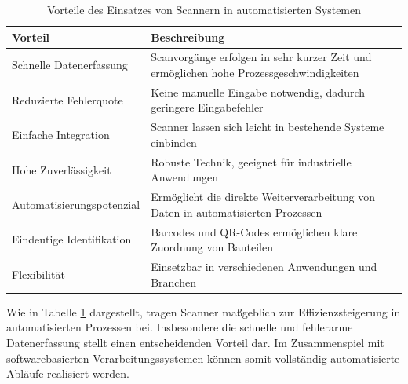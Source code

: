 \begin{table}[H]
	\centering
	\renewcommand{\arraystretch}{1.3}
	\begin{tabular}{|p{5cm}|p{7cm}|}
		\hline
		\textbf{Vorteil} & \textbf{Beschreibung} \\ \hline
		Schnelle Datenerfassung & Scanvorgänge erfolgen in sehr kurzer Zeit und ermöglichen hohe Prozessgeschwindigkeiten \\ \hline
		Reduzierte Fehlerquote & Keine manuelle Eingabe notwendig, dadurch geringere Eingabefehler \\ \hline
		Einfache Integration & Scanner lassen sich leicht in bestehende Systeme einbinden \\ \hline
		Hohe Zuverlässigkeit & Robuste Technik, geeignet für industrielle Anwendungen \\ \hline
		Automatisierungspotenzial & Ermöglicht die direkte Weiterverarbeitung von Daten in automatisierten Prozessen \\ \hline
		Eindeutige Identifikation & Barcodes und QR-Codes ermöglichen klare Zuordnung von Bauteilen \\ \hline
		Flexibilität & Einsetzbar in verschiedenen Anwendungen und Branchen \\ \hline
	\end{tabular}
	\caption{Vorteile des Einsatzes von Scannern in automatisierten Systemen\cite{Datalogic}}
	\label{tab:vorteile_scanner}
\end{table}

Wie in Tabelle \ref{tab:vorteile_scanner} dargestellt, tragen Scanner maßgeblich zur Effizienzsteigerung in automatisierten Prozessen bei. Insbesondere die schnelle und fehlerarme Datenerfassung stellt einen entscheidenden Vorteil dar. Im Zusammenspiel mit softwarebasierten Verarbeitungssystemen können somit vollständig automatisierte Abläufe realisiert werden.